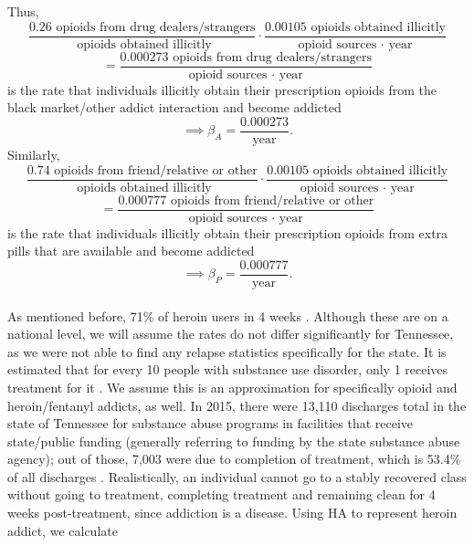 \documentclass[12pt]{article}
\begin{document}
Thus, 
$$\frac{0.26 \text{ opioids from drug dealers/strangers}}{\text{ opioids obtained illicitly}}\cdot \frac{0.00105 \text{ opioids obtained illicitly}}{\text{opioid sources $\cdot$ year}}$$
$$ =\frac{0.000273 \text{ opioids from drug dealers/strangers}}{\text{opioid sources $\cdot$ year}}$$
is the rate that individuals illicitly obtain their prescription opioids from the black market/other addict interaction and become addicted
$$\implies \beta_A=\frac{0.000273}{\text{year}}.$$
Similarly,
$$\frac{0.74 \text{ opioids from friend/relative or other}}{\text{ opioids obtained illicitly}}\cdot \frac{0.00105 \text{ opioids obtained illicitly}}{\text{opioid sources $\cdot$ year}}$$
$$ =\frac{0.000777 \text{ opioids from friend/relative or other}}{\text{opioid sources $\cdot$ year}}$$
is the rate that individuals illicitly obtain their prescription opioids from extra pills that are available and become addicted
$$ \implies \beta_P=\frac{0.000777}{\text{year}}.$$ \\
As mentioned before, 71\% of heroin users in 4 weeks \cite{Smyth}. Although these are on a national level, we will assume the rates do not differ significantly for Tennessee, as we were not able to find any relapse statistics specifically for the state. It is estimated that for every 10 people with substance use disorder, only 1 receives treatment for it \cite{SurgeonGeneral}. We assume this is an approximation for specifically opioid and heroin/fentanyl addicts, as well. In 2015, there were 13,110 discharges total in the state of Tennessee for substance abuse programs in facilities that receive state/public funding (generally referring to funding by the state substance abuse agency); out of those, 7,003 were due to completion of treatment, which is 53.4\% of all discharges \cite{TEDS2015_SAMSHA_discharges}. Realistically, an individual cannot go to a stably recovered class without going to treatment, completing treatment and remaining clean for 4 weeks post-treatment, since addiction is a disease. Using HA to represent heroin addict, we calculate
\end{document}
